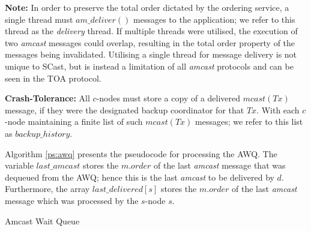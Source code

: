 \begin{enumerate}
        \textbf{Note:} In order to preserve the total order dictated by the ordering service, a single thread must $am\_deliver()$ messages to the application; we refer to this thread as the \emph{delivery} thread.  If multiple threads were utilised, the execution of two \emph{amcast} messages could overlap, resulting in the total order property of the messages being invalidated.  Utilising a single thread for message delivery is not unique to \textsf{SCast}, but is instead a limitation of all \emph{amcast} protocols and can be seen in the TOA protocol.    
        
        \textbf{Crash-Tolerance:} All $c$-nodes must store a copy of a delivered $mcast(Tx)$ message, if they were the designated backup coordinator for that $Tx$.  With each $c$-node maintaining a finite list of such $mcast(Tx)$ messages; we refer to this list as $backup\_history$.  
        \endleftbar

        Algorithm \ref{ps:awq} presents the pseudocode for processing the AWQ.  The variable $last\_amcast$ stores the $m.order$ of the last \emph{amcast} message that was dequeued from the AWQ; hence this is the last \emph{amcast} to be delivered by $d$.  Furthermore, the array $last\_delivered[s]$ stores the $m.order$ of the last \emph{amcast} message which was processed by the $s$-node $s$.  
    
    \end{enumerate}
    \begin{algorithm}[H]
       \caption{Amcast Wait Queue}
        \label{ps:awq}
        \begin{algorithmic}[1]	        
	                
	                \ENDIF
	            \ENDIF
	            \ENDIF
	        \ENDWHILE
        \end{algorithmic}
    \end{algorithm}   
